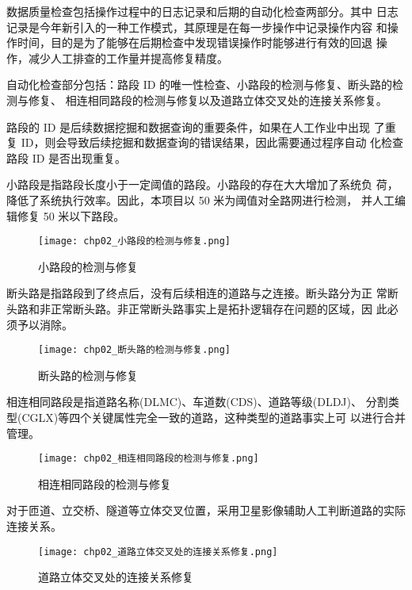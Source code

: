 数据质量检查包括操作过程中的日志记录和后期的自动化检查两部分。其中
日志记录是今年新引入的一种工作模式，其原理是在每一步操作中记录操作内容
和操作时间，目的是为了能够在后期检查中发现错误操作时能够进行有效的回退
操作，减少人工排查的工作量并提高修复精度。

自动化检查部分包括：路段 ID 的唯一性检查、小路段的检测与修复、断头路的检测与修复、
相连相同路段的检测与修复以及道路立体交叉处的连接关系修复。

路段的 ID 是后续数据挖掘和数据查询的重要条件，如果在人工作业中出现
了重复 ID，则会导致后续挖掘和数据查询的错误结果，因此需要通过程序自动
化检查路段 ID 是否出现重复。

小路段是指路段长度小于一定阈值的路段。小路段的存在大大增加了系统负
荷，降低了系统执行效率。因此，本项目以 50 米为阈值对全路网进行检测，
并人工编辑修复 50 米以下路段。

\begin{figure}[ht]
  \centering
  \texttt{[image: chp02\_小路段的检测与修复.png]}
  \caption{小路段的检测与修复\label{fig:小路段的检测与修复}}
\end{figure}

断头路是指路段到了终点后，没有后续相连的道路与之连接。断头路分为正
常断头路和非正常断头路。非正常断头路事实上是拓扑逻辑存在问题的区域，因
此必须予以消除。

\begin{figure}[ht]
  \centering
  \texttt{[image: chp02\_断头路的检测与修复.png]}
  \caption{断头路的检测与修复\label{fig:断头路的检测与修复}}
\end{figure}

相连相同路段是指道路名称(DLMC)、车道数(CDS)、道路等级(DLDJ)、
分割类型(CGLX)等四个关键属性完全一致的道路，这种类型的道路事实上可
以进行合并管理。

\begin{figure}[!ht]
  \centering
  \texttt{[image: chp02\_相连相同路段的检测与修复.png]}
  \caption{相连相同路段的检测与修复\label{fig:相连相同路段的检测与修复}}
\end{figure}

对于匝道、立交桥、隧道等立体交叉位置，采用卫星影像辅助人工判断道路的实际连接关系。

\begin{figure}[!ht]
  \centering
  \texttt{[image: chp02\_道路立体交叉处的连接关系修复.png]}
  \caption{道路立体交叉处的连接关系修复\label{fig:道路立体交叉处的连接关系修复}}
\end{figure}

